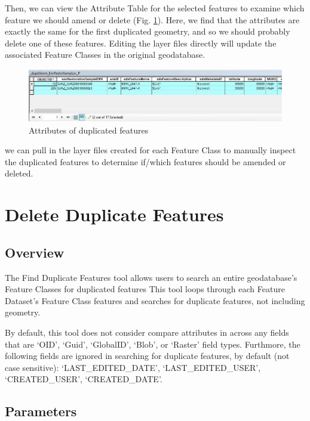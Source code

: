 \documentclass[openany]{book}
\theoremstyle{definition}
\theoremstyle{definition}
\theoremstyle{definition}
\theoremstyle{remark}
\begin{document}
Then, we can view the Attribute Table for the selected features to
examine which feature we should amend or delete (Fig.
\ref{fig:layAtts}). Here, we find that the attributes are exactly the
same for the first duplicated geometry, and so we should probably delete
one of these features. Editing the layer files directly will update the
associated Feature Classes in the original geodatabase.

\begin{figure}[H]

{\centering \includegraphics{figures/dupG-layAtts} 

}

\caption{Attributes of duplicated features}\label{fig:layAtts}
\end{figure}

we can pull in the layer files created for each Feature Class to
manually inspect the duplicated features to determine if/which features
should be amended or deleted.

\chapter{Delete Duplicate Features}\label{delFeats}

\section{Overview}\label{overview-4}

The Find Duplicate Features tool allows users to search an entire
geodatabase's Feature Classes for duplicated features This tool loops
through each Feature Dataset's Feature Class features and searches for
duplicate features, not including geometry.

By default, this tool does not consider compare attributes in across any
fields that are `OID', `Guid', `GlobalID', `Blob', or `Raster' field
types. Furthmore, the following fields are ignored in searching for
duplicate features, by default (not case sensitive):
`LAST\_EDITED\_DATE', `LAST\_EDITED\_USER', `CREATED\_USER',
`CREATED\_DATE'.

\section{Parameters}\label{parameters-4}
\end{document}
